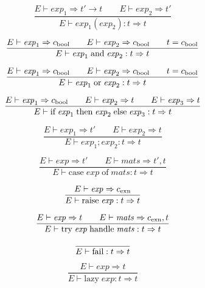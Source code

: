 \documentclass[twoside]{article}
\newcommand{\x}[1]{\mathit{#1}}
\newcommand{\f}[1]{\mbox{#1}}
\renewcommand{\c}[1]{c_{\f{\scriptsize #1}}}
\renewcommand{\exp}{\x{exp}}
\newcommand{\mats}{\x{mats}}
\begin{document}
\begin{equation}
\frac{
E \vdash \exp_1 \Rightarrow t' \to t
\qquad
E \vdash \exp_2 \Rightarrow t'
}{
E \vdash \exp_1(\exp_2) : t \Rightarrow t
}
\end{equation}

\begin{equation}
\frac{
E \vdash \exp_1 \Rightarrow \c{bool}
\qquad
E \vdash \exp_2 \Rightarrow \c{bool}
\qquad
t = \c{bool}
}{
E \vdash \exp_1\;\f{and}\;\exp_2 : t \Rightarrow t
}
\end{equation}

\begin{equation}
\frac{
E \vdash \exp_1 \Rightarrow \c{bool}
\qquad
E \vdash \exp_2 \Rightarrow \c{bool}
\qquad
t = \c{bool}
}{
E \vdash \exp_1\;\f{or}\;\exp_2 : t \Rightarrow t
}
\end{equation}

\begin{equation}
\frac{
E \vdash \exp_1 \Rightarrow \c{bool}
\qquad
E \vdash \exp_2 \Rightarrow t
\qquad
E \vdash \exp_3 \Rightarrow t
}{
E \vdash \f{if}\;\exp_1\;\f{then}\;\exp_2\;\f{else}\;\exp_3 : t \Rightarrow t
}
\end{equation}

\begin{equation}
\frac{
E \vdash \exp_1 \Rightarrow t'
\qquad
E \vdash \exp_2 \Rightarrow t
}{
E \vdash \exp_1;\exp_2 : t \Rightarrow t
}
\end{equation}

\begin{equation}
\frac{
E \vdash \exp \Rightarrow t'
\qquad
E \vdash \mats \Rightarrow t',t
}{
E \vdash \f{case}\;\exp\;\f{of}\;\mats : t \Rightarrow t
}
\end{equation}

\begin{equation}
\frac{
E \vdash \exp \Rightarrow \c{exn}
}{
E \vdash \f{raise}\;\exp : t \Rightarrow t
}
\end{equation}

\begin{equation}
\frac{
E \vdash \exp \Rightarrow t
\qquad
E \vdash \mats \Rightarrow \c{exn},t
}{
E \vdash \f{try}\;\exp\;\f{handle}\;\mats : t \Rightarrow t
}
\end{equation}

\begin{equation}
\frac{
}{
E \vdash \f{fail} : t \Rightarrow t
}
\end{equation}

\begin{equation}
\frac{
E \vdash \exp \Rightarrow t
}{
E \vdash \f{lazy}\;\exp : t \Rightarrow t
}
\end{equation}
\end{document}
